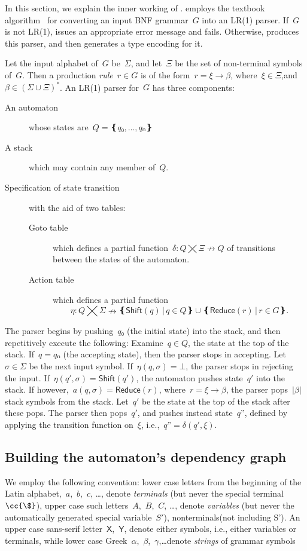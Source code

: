 In this section, we explain the inner working of \Self.
\Self employs the textbook algorithm~\cite{Aho:86} for converting an input
  BNF grammar~$G$ into an LR(1) parser.
If~$G$ is not LR(1), \Self issues an
  appropriate error message and fails.
Otherwise, \Self produces this parser, and
  then generates a \Java type encoding for it.

Let the input alphabet of~$G$ be~$Σ$, and let~$Ξ$ be the set of non-terminal symbols
of~$G$.
Then a production \emph{rule}~$r∈G$ is of the form~$r =ξ→β$, where~$ξ∈Ξ$,and~$β∈\left(Σ∪Ξ\right)^*$.
An LR(1) parser for~$G$ has three components:
\begin{description}
  \item[An automaton] whose states are~$Q=❴q₀,…,qₙ❵$
  \item[A stack] which may contain any member of~$Q$.
  \item[Specification of state transition] with the aid of two tables:
        \begin{description}
          \item[Goto table] which defines a partial function~$δ:Q⨉Ξ↛Q$ of transitions
          between the states of the automaton.
          \item[Action table] which
            defines a partial function\[η:Q⨉Σ↛ ❴ \textsf{Shift}(q) \,|\, q∈Q❵ ∪ ❴\textsf{Reduce}(r) \,| \, r∈G❵.\]
        \end{description}
\end{description}
The parser begins by pushing~$q₀$ (the initial state) into the stack,
and then repetitively execute the following:
Examine~$q∈Q$, the state at the top of the stack.
If~$q=qₙ$ (the accepting state), then the parser stops in accepting.
Let~$σ∈Σ$ be the next input symbol.
If~$η(q,σ)=⊥$, the parser stops in rejecting the input.
If~$η(q',σ) = \textsf{Shift}(q')$, the automaton pushes state~$q'$ into the stack.
If however,~$a(q,σ) = \textsf{Reduce}(r)$,
where~$r=ξ→β$,
the parser pops~$|β|$ stack symbols from the stack.
Let~$q'$ be the state at the top of the stack after these pops.
The parser then pops~$q'$, and pushes instead state~$q”$, defined by applying the transition function on~$ξ$, i.e.,~$q”=δ(q',ξ)$.

\subsection{Building the automaton's dependency graph}

  We employ the following convention:
  lower case letters from the beginning of the Latin alphabet,~$a$,~$b$,~$c$, …,
  denote \emph{terminals} (but never the special terminal~$\cc{\$}$),
    upper case such letters~$A$,~$B$,~$C$, …, denote \emph{variables}
  (but never the automatically generated special variable~$S'$),
  nonterminals(not including S').
  An upper case sans-serif letter~$\mathsf X$,~$\mathsf Y$, denote
    either symbols, i.e., either variables or terminals,
    while lower case Greek~$α$,~$β$,~$γ$,…denote \emph{strings} of grammar symbols

